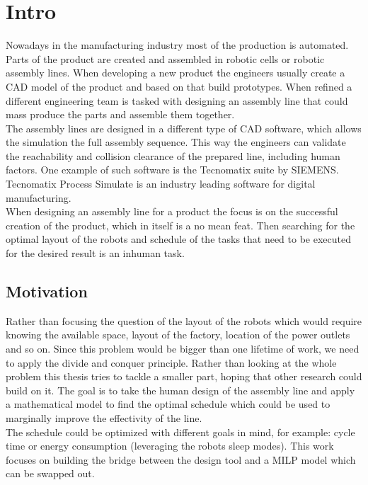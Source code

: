 \section{Intro}
Nowadays in the manufacturing industry most of the production is automated. Parts of the product are created and assembled in robotic cells or robotic assembly lines. When developing a new product the engineers usually create a CAD model of the product and based on that build prototypes. When refined a different engineering team is tasked with designing an assembly line that could mass produce the parts and assemble them together. \\ 

The assembly lines are designed in a different type of CAD software, which allows the simulation the full assembly sequence. This way the engineers can validate the reachability and collision clearance of the prepared line, including human factors. One example of such software is the Tecnomatix suite by SIEMENS. Tecnomatix Process Simulate is an industry leading software for digital manufacturing. \\ 

When designing an assembly line for a product the focus is on the successful creation of the product, which in itself is a no mean feat. Then searching for the optimal layout of the robots and schedule of the tasks that need to be executed for the desired result is an inhuman task. 

\subsection{Motivation}

Rather than focusing the question of the layout of the robots which would require knowing the available space, layout of the factory, location of the power outlets and so on. Since this problem would be bigger than one lifetime of work, we need to apply the divide and conquer principle. Rather than looking at the whole problem this thesis tries to tackle a smaller part, hoping that other research could build on it. The goal is to take the human design of the assembly line and apply a mathematical model to find the optimal schedule which could be used to marginally improve the effectivity of the line. \\

The schedule could be optimized with different goals in mind, for example: cycle time or energy consumption (leveraging the robots sleep modes). This work focuses on building the bridge between the design tool and a MILP model which can be swapped out. 

